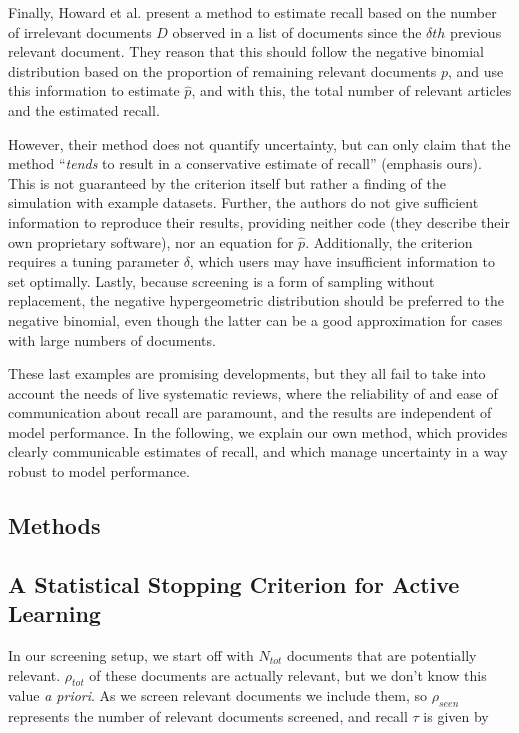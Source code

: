\documentclass{bmcart}
\begin{document}
	Finally, Howard et al. \cite{Howard2020} present a method to estimate recall based on the number of irrelevant documents $D$ observed in a list of documents since the $\delta th$ previous relevant document. 
	They reason that this should follow the negative binomial distribution based on the proportion of remaining relevant documents $p$, and use this information to estimate $\hat{p}$, and with this, the total number of relevant articles and the estimated recall.
	
	However, their method does not quantify uncertainty, but can only claim that the method ``\textit{tends} to result in a conservative estimate of recall'' (emphasis ours). This is not guaranteed by the criterion itself but rather a finding of the simulation with example datasets. Further, the authors do not give sufficient information to reproduce their results, providing neither code (they describe their own proprietary software), nor an equation for $\hat{p}$. Additionally, the criterion requires a tuning parameter $\delta$, which users may have insufficient information to set optimally.
	Lastly, because screening is a form of sampling without replacement, the negative hypergeometric distribution should be preferred to the negative binomial, even though the latter can be a good approximation for cases with large numbers of documents.
	
	These last examples are promising developments, but they all fail to take into account the needs of live systematic reviews, where the reliability of and ease of communication about recall are paramount, and the results are independent of model performance. In the following, we explain our own method, which provides clearly communicable estimates of recall, and which manage uncertainty in a way robust to model performance.
	
	\subsection*{Methods}
	
	\subsection*{A Statistical Stopping Criterion for Active Learning}
	
	In our screening setup, we start off with $N_{tot}$ documents that are potentially relevant. $\rho_{tot}$ of these documents are actually relevant, but we don't know this value \textit{a priori}. As we screen relevant documents we include them, so $\rho_{seen}$ represents the number of relevant documents screened, and recall $\tau$ is given by 
	
\end{document}
